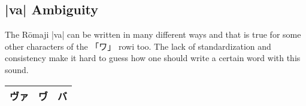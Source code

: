 \subsection{|va|  Ambiguity} \label{subsec:VaAmbiguity}

The Rōmaji |va| can be written in many different ways and that is true for some
other characters of the {「ワ」} rowi too. The lack of standardization and
consistency make it hard to guess how one should write a certain word with this
sound.

\bigskip

\begin{center}
\Huge
\begin{tabular}{|c|c|c|}\hline
ヴァ&ヷ&バ\\\hline
\end{tabular}
\end{center}

